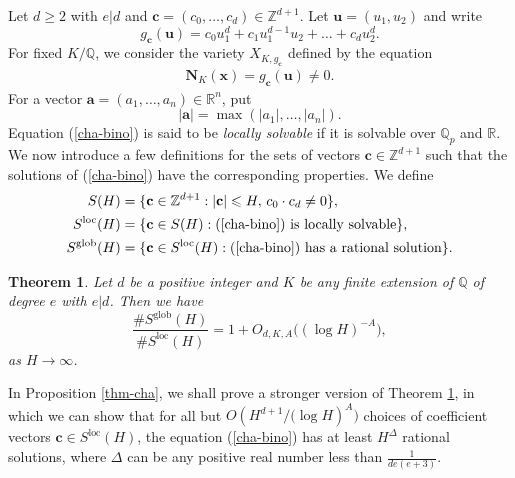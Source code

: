 \documentclass[reqno, 11pt]{amsart}
\renewcommand{\leq}{\leqslant}
\renewcommand{\geq}{\geqslant}
\newtheorem{theorem}{Theorem}[section]
\theoremstyle{definition}
\theoremstyle{definition}
\renewcommand{\geq}{\geqslant}
\renewcommand{\leq}{\leqslant}
\newcommand{\RR}{\mathbb{R}}
\newcommand{\cc}{\mathbf{c}}
\newcommand{\uu}{\mathbf{u}}
\newcommand{\xx}{\mathbf{x}}
\newcommand{\QQ}{\mathbb{Q}}
\newcommand{\ZZ}{\mathbb{Z}}
\newcommand{\NNN}{\mathbf{N}}
\numberwithin{equation}{section}
\begin{document}
Let $d \geq 2$ with $e | d$ and $\cc = (c_0, \dots, c_d) \in \ZZ^{d+1}$. Let $\uu = (u_1, u_2)$ and write
$$g_\cc(\uu) = c_0u_1^d + c_1 u_1^{d-1}u_2 + \dots + c_d u_2^d.$$
For fixed $K / \QQ$, we consider the variety $X_{K, g_\cc}$ defined by the equation
\begin{eqnarray}\label{cha-bino}
	\NNN_K(\xx) = g_{\cc}(\uu) \neq 0.
\end{eqnarray}
For a vector $\mathbf{a} = (a_1, \dots, a_n) \in \RR^n$, put
$$|\mathbf{a}| = \max(|a_1|, \dots, |a_n|).$$
Equation (\ref{cha-bino}) is said to be \emph{locally solvable} if it is solvable over $\QQ_p$ and $\RR$.
We now introduce a few definitions for the sets of vectors \(\cc \in \ZZ^{d+1}\) such that the solutions of (\ref{cha-bino}) have the corresponding properties. We define
\begin{align}\label{Def-S}
    \nonumber S(H) & = \{\cc \in \ZZ^{d+1}: |\cc| \leq H, \, c_0 \cdot c_d \neq 0 \}, \\
    S^{\mathrm{loc}}(H) & = \{\cc \in S(H): \text{(\ref{cha-bino}) is locally solvable} \}, \\
	\nonumber S^{\mathrm{glob}}(H) & = \{\cc \in S^{\mathrm{loc}}(H): \text{(\ref{cha-bino}) has a rational solution}\}.
\end{align}

\begin{theorem}\label{thm-HP}
	Let $d$ be a positive integer and $K$ be any finite extension of $\QQ$ of degree $e$ with $e|d$. Then we have
	$$\frac{\# S^{\mathrm{glob}}(H)}{\# S^{\mathrm{loc}}(H)} = 1 + O_{d,K,A} \big( (\log H)^{-A} \big),$$
	as $H \rightarrow \infty$.
\end{theorem}

In Proposition \ref{thm-cha}, we shall prove a stronger version of Theorem \ref{thm-HP}, in which we can show that for all but $O(H^{d+1} / \big(\log H)^A\big)$ choices of coefficient vectors $\cc \in S^{\mathrm{loc}}(H)$, the equation (\ref{cha-bino}) has at least $H^{\Delta}$ rational solutions, where $\Delta$ can be any positive real number less than $\frac{1}{de(e+3)}$.


\end{document}
